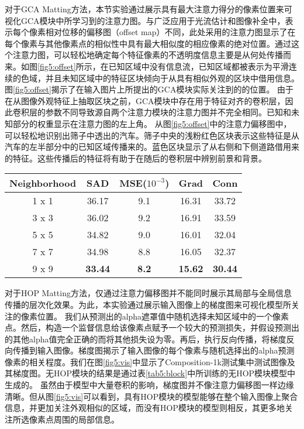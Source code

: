 对于GCA Matting方法，本节实验通过展示具有最大注意力得分的像素位置来可视化GCA模块中所学习到的注意力图。与广泛应用于光流估计\cite{FlowNet,LiteFlowNet,PWC-Net}和图像补全\cite{yu2018generative}中，表示每个像素相对位移的偏移图（offset map）不同，此处采用的注意力图显示了在每个像素与其他像素点的相似性中具有最大相似度的相应像素的绝对位置。通过这个注意力图，可以轻松地确定每个特征像素的不透明度信息主要是从何处传播而来。如图\ref{fig5:offset}所示，在已知区域中没有信息流，已知区域都被表示为平滑连续的色域，并且未知区域中的特征区块倾向于从具有相似外观的区块中借用信息。
图\ref{fig5:offset}揭示了在输入图片上所提出的GCA模块实际关注到的的位置。
由于在从图像外观特征上抽取区块之前，GCA模块中存在用于特征对齐的卷积层，因此卷积层的参数不同导致源自两个注意力模块的注意力图并不完全相同。已知和未知部分的权重显示在注意力图的左上角。
从图\ref{fig5:offset}中的注意力偏移图中，可以轻松地识别出筛子中透出的汽车。筛子中央的浅粉红色区块表示这些特征是从汽车的左半部分中的已知区域传播来的。蓝色区块显示了从右侧和下侧道路借用来的特征。这些传播后的特征将有助于在随后的卷积层中辨别前景和背景。

\begin{table}[t]	
	\setlength{\tabcolsep}{15pt}
	\centering
	\small
	\begin{tabular}{c|cccc}  
		\toprule
		Neighborhood & SAD & MSE($10^{-3}$)& Grad & Conn\\%
		\midrule
		1 x 1 & 36.17& 9.1& 16.31& 33.72 \\  %
		3 x 3 & 36.02& 9.2 & 16.91& 33.59 \\  %
		5 x 5& 34.82& 9.0 & 16.01& 32.04  \\  %
		7 x 7 &34.98&8.8&16.05 & 32.37 \\  %
		9 x 9 &\textbf{33.44}&\textbf{8.2}& \textbf{15.62}&\textbf{30.44}  \\  %
		\bottomrule
	\end{tabular}
	\label{tab5:winsize}
\end{table}

对于HOP Matting方法，仅通过注意力偏移图并不能同时展示其局部与全局信息传播的层次化效果。为此，本实验通过展示输入图像上的梯度图来可视化模型所关注的像素位置。
我们从预测出的alpha遮罩值中随机选择未知区域中的一个像素点。然后，构造一个监督信息给该像素点赋予一个较大的预测损失，并假设预测出的其他alpha值完全正确的而将其他损失设为零。再后，执行反向传播，将梯度反向传播到输入图像。梯度图揭示了输入图像的每个像素与随机选择出的alpha预测像素的相关程度。我们在图\ref{fig5:vis}中显示了Composition-1k测试集\cite{xu2017deep}中测试图像及其梯度图。无HOP模块的结果是通过表\ref{tab5:block}中所训练的无HOP模块模型中生成的。
虽然由于模型中大量卷积的影响，梯度图并不像注意力偏移图一样边缘清晰。但从图\ref{fig5:vis}可以看到，具有HOP模块的模型能够在整个输入图像上聚合信息，并更加关注外观相似的区域，而没有HOP模块的模型则相反，其更多地关注所选像素点周围的局部信息。


